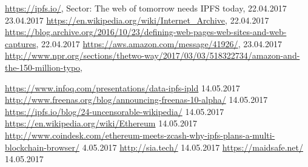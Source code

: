 \documentclass[a4paper,11pt, oneside]{report}
\theoremstyle{definition}
\begin{document}
\begin{thebibliography}{1}
 \url{https://ipfs.io/}, Sector: The web of tomorrow needs IPFS today, 22.04.2017
 23.04.2017
 \url{https://en.wikipedia.org/wiki/Internet_Archive}, 22.04.2017
 \url{https://blog.archive.org/2016/10/23/defining-web-pages-web-sites-and-web-captures}, 22.04.2017
 \url{https://aws.amazon.com/message/41926/}, 23.04.2017
 \url{http://www.npr.org/sections/thetwo-way/2017/03/03/518322734/amazon-and-the-150-million-typo},

 \url{https://www.infoq.com/presentations/data-ipfs-ipld} 14.05.2017
 \url{http://www.freenas.org/blog/announcing-freenas-10-alpha/} 14.05.2017
 \url{https://ipfs.io/blog/24-uncensorable-wikipedia/} 14.05.2017
 \url{https://en.wikipedia.org/wiki/Ethereum} 14.05.2017
 \url{http://www.coindesk.com/ethereum-meets-zcash-why-ipfs-plans-a-multi-blockchain-browser/} 4.05.2017
 \url{http://sia.tech/}  14.05.2017
 \url{https://maidsafe.net/} 14.05.2017


\end{thebibliography}


\printglossaries

\listoffigures
\end{document}
